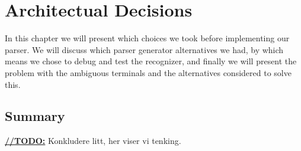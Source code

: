 \chapter{Architectual Decisions}

In this chapter we will present which choices we took before implementing our parser. We will discuss which parser generator alternatives we had, by which means we chose to debug and test the recognizer, and finally we will present the problem with the ambiguous terminals and the alternatives considered to solve this.





\section{Summary}
\underline{\textbf{\LARGE //TODO:}} Konkludere litt, her viser vi tenking.